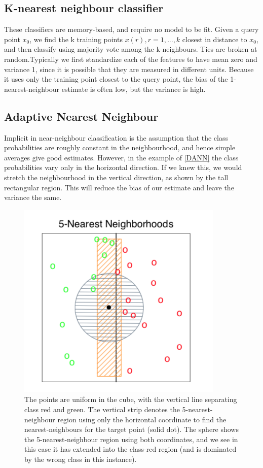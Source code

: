 \subsection{K-nearest neighbour classifier}
These classifiers are memory-based, and require no model to be fit. Given a query point $x_0$, we find the k training points $x(r),r = 1,...,k$ closest in distance to $x_0$, and then classify using majority vote among the k-neighbours. Ties are broken at random.Typically we first standardize each of the features to have mean zero and variance 1, since it is possible that they are measured in different units. Because it uses only the training point closest to the query point, the bias of the 1-nearest-neighbour estimate is often low, but the variance is high.

\subsection{Adaptive Nearest Neighbour}
Implicit in near-neighbour classification is the assumption that the class probabilities are roughly constant in the neighbourhood, and hence simple averages give good estimates.
However, in the example of \autoref{DANN} the class probabilities vary only in the horizontal direction. If we knew this, we would stretch the neighbourhood in the vertical direction, as shown by the tall rectangular region. This will reduce the bias of our estimate and leave the variance the same.

\begin{figure}
\centering
\includegraphics[scale=0.7]{img/DANN}
\caption{The points are uniform in the cube, with the vertical line separating class red and green. The vertical strip denotes the 5-nearest-neighbour region using only the horizontal coordinate to find the nearest-neighbours for the target point (solid dot). The sphere shows the 5-nearest-neighbour region using both coordinates, and we see in this case it has extended into the class-red region (and is dominated by the wrong class in this instance).}
\label{DANN}
\end{figure}


